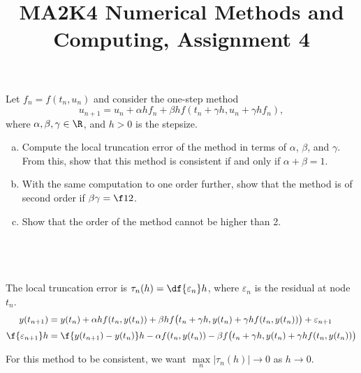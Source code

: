 \documentclass[a4paper]{article}
\title{MA2K4 Numerical Methods and Computing, Assignment 4}
\begin{document}
\maketitle

\setlength{\parindent}{0em}
\setlength{\parskip}{1em}


\begin{questionbody}
Let $f_n = f(t_n, u_n)$ and consider the one-step method \[
u_{n+1} = u_n + \alpha h f_n + \beta h f(t_n + \gamma h, u_n + \gamma h f_n),
\] where $\alpha, \beta, \gamma \in \R$, and $h > 0$ is the stepsize.
\begin{enumerate}[(a)]
\item Compute the local truncation error of the method in terms of $\alpha$, $\beta$, and $\gamma$. From this, show that this method is consistent if and only if $\alpha + \beta = 1$.

\item With the same computation to one order further, show that the method is of second order if $\beta \gamma = \f12$.

\item Show that the order of the method cannot be higher than 2.
\end{enumerate}
\end{questionbody}

\subsection{~} %

The local truncation error is $\tau_n(h) = \df{\varepsilon_n}h$, where $\varepsilon_n$ is the residual at node $t_n$.
\begin{align*}
y(t_{n+1}) &= y(t_n) + \alpha h f(t_n, y(t_n)) + \beta h f \big( t_n + \gamma h, y(t_n) + \gamma h f(t_n, y(t_n)) \big) + \varepsilon_{n+1} \\[0.5ex]
\f{\varepsilon_{n+1}}h &= \f{y(t_{n+1}) - y(t_n)}h - \alpha f(t_n, y(t_n)) - \beta f \big( t_n + \gamma h, y(t_n) + \gamma h f(t_n, y(t_n)) \big)
\end{align*}

For this method to be consistent, we want $\max\limits_n |\tau_n(h)| \to 0$ as $h \to 0$.

\end{document}
